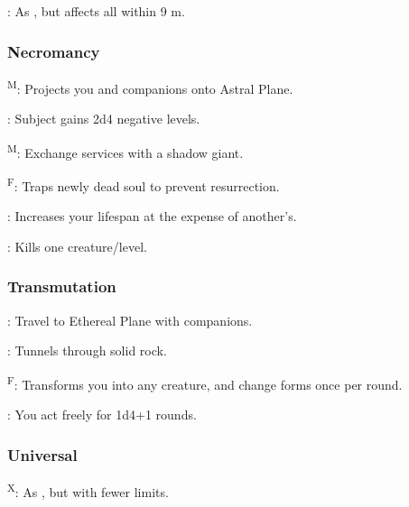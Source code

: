 	: As , but affects all within 9 m.

\subsubsection{Necromancy}
	\textsuperscript{M}: Projects you and companions onto Astral Plane.

	: Subject gains 2d4 negative levels.

	\textsuperscript{M}: Exchange services with a shadow giant. %

	\textsuperscript{F}: Traps newly dead soul to prevent resurrection.

	: Increases your lifespan at the expense of another's. %

	: Kills one creature/level.

\subsubsection{Transmutation}
	: Travel to Ethereal Plane with companions.

	: Tunnels through solid rock. %

	\textsuperscript{F}: Transforms you into any creature, and change forms once per round.

	: You act freely for 1d4+1 rounds.

\subsubsection{Universal}
	\textsuperscript{X}: As , but with fewer limits.